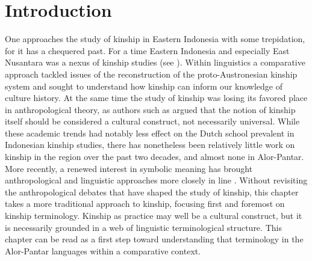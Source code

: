 \section{Introduction}\footnotemark{}
\hypertarget{Toc376958238}{}
One approaches the study of kinship in Eastern Indonesia with some trepidation, for it has a chequered past. For a time Eastern Indonesia and especially East Nusantara was a nexus of kinship studies (see \citep{Fox1980,VanWouden1968}). Within linguistics a comparative approach tackled issues of the reconstruction of the proto-Austronesian kinship system and sought to understand how kinship can inform our knowledge of culture history. At the same time the study of kinship was losing its favored place in anthropological theory, as authors such as \citet{Schneider1984} argued that the notion of kinship itself should be considered a cultural construct, not necessarily universal. While these academic trends had notably less effect on the Dutch school prevalent in Indonesian kinship studies, there has nonetheless been relatively little work on kinship in the region over the past two decades, and almost none in Alor-Pantar. More recently, a renewed interest in symbolic meaning has brought anthropological and linguistic approaches more closely in line \citep[see][]{Schweitzer2000}. Without revisiting the anthropological debates that have shaped the study of kinship, this chapter takes a more traditional approach to kinship, focusing first and foremost on kinship terminology. Kinship as practice may well be a cultural construct, but it is necessarily grounded in a web of linguistic terminological structure. This chapter can be read as a first step toward understanding that terminology in the Alor-Pantar languages within a comparative context.

